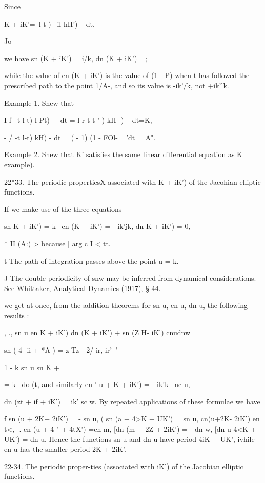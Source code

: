 Since

K + iK'=\ l-t-)-- il-hH')- ~dt,

Jo

we have sn (K + iK') = i/k, dn (K + iK') =;

while the value of en (K + iK') is the value of (1 - P) when t has
followed the prescribed path to the point 1/A-, and so its value is
-ik'/k, not +ik'lk.

Example 1. Shew that

I f \ t l-t) l-Pt) ~- dt = l r t t-' ) kH- ) ~ dt=K,

- / -t l-t) kH) - dt = ( - 1) (1 - FOl- ~ 'dt = A".

Example 2. Shew that K' satisfies the same linear differential
equation as K  example).

22*33. The periodic propertiesX associated with K + iK') of the
Jacohian elliptic functions.

If we make use of the three equations

sn K + iK') = k-\ en (K + iK') = - ik'jk, dn K + iK') = 0,

* II (A:) > because | arg c I < tt.

t The path of integration passes above the point u = k.

J The double periodicity of snw may be inferred from dynamical
considerations. See Whittaker, Analytical Dynamics (1917), § 44.

%
%

we get at once, from the addition-theorems for sn u, en u, dn u, the
following results :

, ., sn u en K + iK') dn (K + iK') + sn (Z H- iK') cnudnw

sn ( 4- ii + *A ) = z Tz - 2/ ir, ir'\ '

  1 - k sn u sn K +%

= k~ do (t, and similarly en ' u + K + iK') = - ik'k~ nc u,

dn (zt + if + iK') = ik' sc w. By repeated applications of these
formulae we have

f sn (u + 2K+ 2iK') = - sn u, ( sn (a + 4>K + UK') = sn u, cn(u+2K-
2iK') en t<, -. en (u + 4 " + 4tX') =cn m, [dn (m + 2Z + 2iK') = - dn
w, [dn u 4<K + UK') = dn u. Hence the functions sn u and dn u have
period 4iK + UK', ivhile en u has the smaller period 2K + 2iK'.

22-34. The periodic proper-ties (associated with iK') of the Jacobian
elliptic functions.


